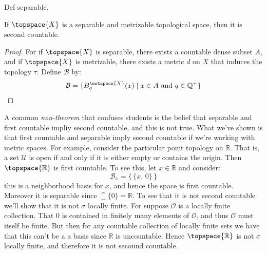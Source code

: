 \documentclass{article}                                                        %
\begin{document}
        Def separable.
        \begin{theorem}
            If $\topspace{X}$ is a separable and metrizable topological space,
            then it is second countable.
        \end{theorem}
        \begin{proof}
            For if $\topspace{X}$ is separable, there exists a countable dense
            subset $A$, and if $\topspace{X}$ is metrizable, there exists a
            metric $d$ on $X$ that induces the topology $\tau$. Define
            $\mathcal{B}$ by:
            \begin{equation}
                \mathcal{B}=
                    \{B_{q}^{\metspace{X}}(x)\;|\;
                        x\in{A}\textrm{ and }q\in\mathbb{Q^{+}}\}
            \end{equation}
        \end{proof}
        \begin{example}
            A common \textit{non-theorem} that confuses students is the belief
            that separable and first countable impliy second countable, and this
            is not true. What we've shown is that first countable and separable
            imply second countable if we're working with metric spaces. For
            example, consider the particular point topology on $\mathbb{R}$.
            That is, a set $\mathcal{U}$ is open if and only if it is either
            empty or contains the origin. Then $\topspace{\mathbb{R}}$ is
            first countable. To see this, let $x\in\mathbb{R}$ and consider:
            \begin{equation}
                \mathcal{B}_{x}=\big\{\,\{x,\,0\}\,\big\}
            \end{equation}
            this is a neighborhood basis for $x$, and hence the space is first
            countable. Moreover it is separable since
            $\closure{\{0\}}=\mathbb{R}$. To see that it is not second countable
            we'll show that it is not $\sigma$ locally finite. For suppose
            $\mathcal{O}$ is a locally finite collection. That $0$ is contained
            in finitely many elements of $\mathcal{O}$, and thus $\mathcal{O}$
            must itself be finite. But then for any countable collection of
            locally finite sets we have that this can't be a a basis since
            $\mathbb{R}$ is uncountable. Hence $\topspace{\mathbb{R}}$ is not
            $\sigma$ locally finite, and therefore it is not secound countable.
        \end{example}
\end{document}
